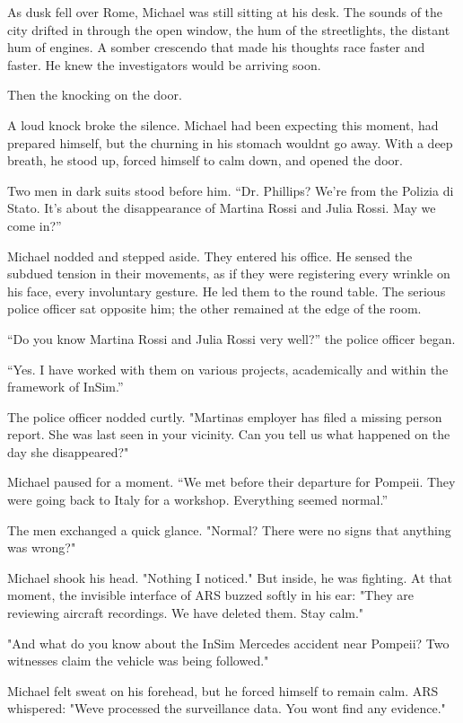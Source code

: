 \documentclass[
]{article}
\begin{document}
As dusk fell over Rome, Michael was still sitting at his desk. The sounds of the city drifted in through the open window, the hum of the streetlights, the distant hum of engines. A somber crescendo that made his thoughts race faster and faster. He knew the investigators would be arriving soon.

Then the knocking on the door.

A loud knock broke the silence. Michael had been expecting this moment, had prepared himself, but the churning in his stomach wouldn\textquotesingle t go away. With a deep breath, he stood up, forced himself to calm down, and opened the door.

Two men in dark suits stood before him. ``Dr. Phillips? We're from the Polizia di Stato. It's about the disappearance of Martina Rossi and Julia Rossi. May we come in?''

Michael nodded and stepped aside. They entered his office. He sensed the subdued tension in their movements, as if they were registering every wrinkle on his face, every involuntary gesture. He led them to the round table. The serious police officer sat opposite him; the other remained at the edge of the room.

``Do you know Martina Rossi and Julia Rossi very well?'' the police officer began.

``Yes. I have worked with them on various projects, academically and within the framework of InSim.''

The police officer nodded curtly. "Martina\textquotesingle s employer has filed a missing person report. She was last seen in your vicinity. Can you tell us what happened on the day she disappeared?"

Michael paused for a moment. ``We met before their departure for Pompeii. They were going back to Italy for a workshop. Everything seemed normal.''

The men exchanged a quick glance. "Normal? There were no signs that anything was wrong?"

Michael shook his head. "Nothing I noticed." But inside, he was fighting. At that moment, the invisible interface of ARS buzzed softly in his ear: "They are reviewing aircraft recordings. We have deleted them. Stay calm."

"And what do you know about the InSim Mercedes accident near Pompeii? Two witnesses claim the vehicle was being followed."

Michael felt sweat on his forehead, but he forced himself to remain calm. ARS whispered: "We\textquotesingle ve processed the surveillance data. You won\textquotesingle t find any evidence."
\end{document}
